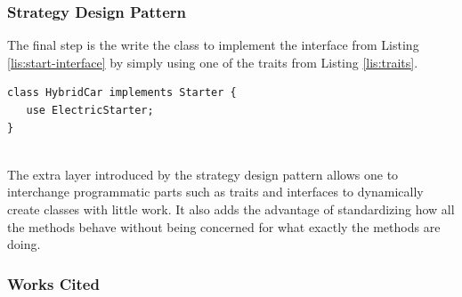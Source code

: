 \documentclass[aspectratio=169]{beamer}
\begin{document}
\begin{frame}[fragile]
\frametitle{Strategy Design Pattern}
The final step is the write the class to implement the interface from Listing \ref{lis:start-interface} by simply using one of the traits from Listing \ref{lis:traits}.
\begin{lstlisting}[caption=Building Out the Strategy Pattern: the Class,label=lis:start-class]
class HybridCar implements Starter {
   use ElectricStarter;
}
\end{lstlisting}

\mbox{}\\
The extra layer introduced by the strategy design pattern allows one to interchange programmatic parts such as traits and interfaces to dynamically create classes with little work. It also adds the advantage of standardizing how all the methods behave without being concerned for what exactly the methods are doing.
\end{frame}

\begin{frame}
\frametitle{Works Cited}

\end{frame}
\end{document}
